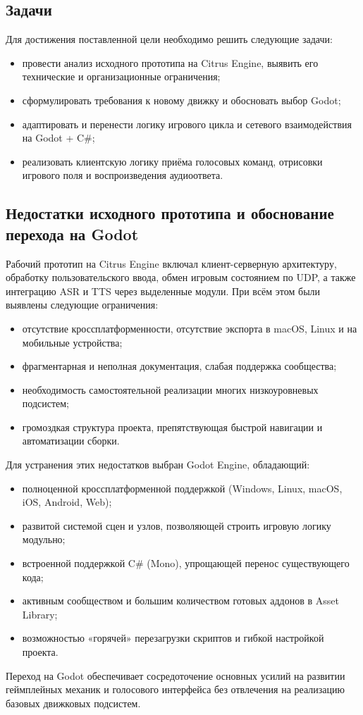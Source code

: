     \subsection{Задачи}
    Для достижения поставленной цели необходимо решить следующие задачи:
    \begin{itemize}
    \item провести анализ исходного прототипа на Citrus Engine, выявить его технические и организационные ограничения;
    \item сформулировать требования к новому движку и обосновать выбор Godot;
    \item адаптировать и перенести логику игрового цикла и сетевого взаимодействия на Godot + C\#;
    \item реализовать клиентскую логику приёма голосовых команд, отрисовки игрового поля и воспроизведения аудиоответа.
    \end{itemize}

    \subsection{Недостатки исходного прототипа и обоснование перехода на Godot}
    Рабочий прототип на Citrus Engine включал клиент-серверную архитектуру, обработку пользовательского ввода, обмен игровым состоянием по 
    UDP, а также интеграцию ASR и TTS через выделенные модули. При всём этом были выявлены следующие ограничения:
    \begin{itemize}
    \item отсутствие кроссплатформенности, отсутствие экспорта в macOS, Linux и на мобильные устройства;
    \item фрагментарная и неполная документация, слабая поддержка сообщества;
    \item необходимость самостоятельной реализации многих низкоуровневых подсистем;
    \item громоздкая структура проекта, препятствующая быстрой навигации и автоматизации сборки.
    \end{itemize}

    Для устранения этих недостатков выбран Godot Engine, обладающий:
    \begin{itemize}
    \item полноценной кроссплатформенной поддержкой (Windows, Linux, macOS, iOS, Android, Web);
    \item развитой системой сцен и узлов, позволяющей строить игровую логику модульно;
    \item встроенной поддержкой C\# (Mono), упрощающей перенос существующего кода;
    \item активным сообществом и большим количеством готовых аддонов в Asset Library;
    \item возможностью «горячей» перезагрузки скриптов и гибкой настройкой проекта.
    \end{itemize}

    Переход на Godot обеспечивает сосредоточение основных усилий на развитии геймплейных механик и голосового интерфейса без отвлечения 
    на реализацию базовых движковых подсистем.